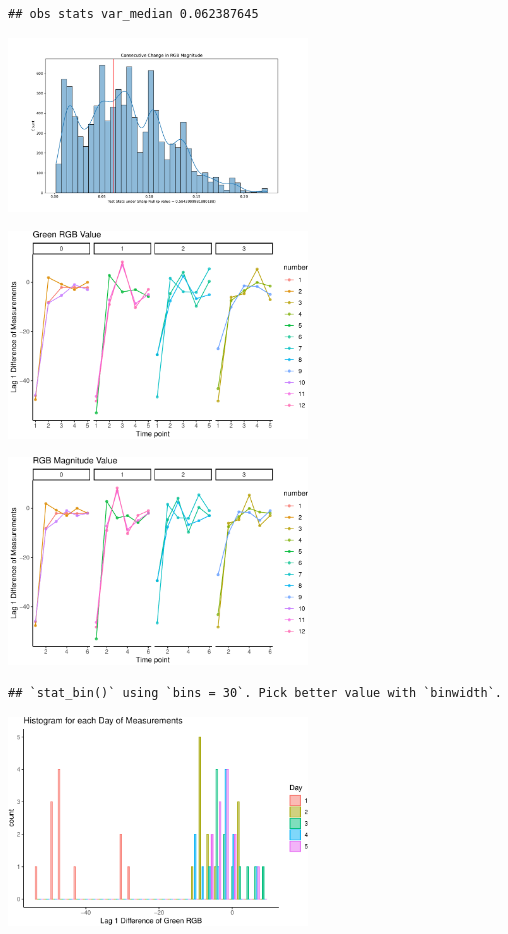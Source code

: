 \documentclass[
  12pt,
]{article}
\begin{document}
\begin{verbatim}
## obs stats var_median 0.062387645
\end{verbatim}

\includegraphics[width=300px]{report_files/figure-latex/unnamed-chunk-23-1}

\includegraphics[width=300px]{report_files/figure-latex/unnamed-chunk-24-3}

\includegraphics[width=300px]{report_files/figure-latex/unnamed-chunk-25-1}

\begin{verbatim}
## `stat_bin()` using `bins = 30`. Pick better value with `binwidth`.
\end{verbatim}

\includegraphics[width=300px]{report_files/figure-latex/unnamed-chunk-26-1}
\end{document}
